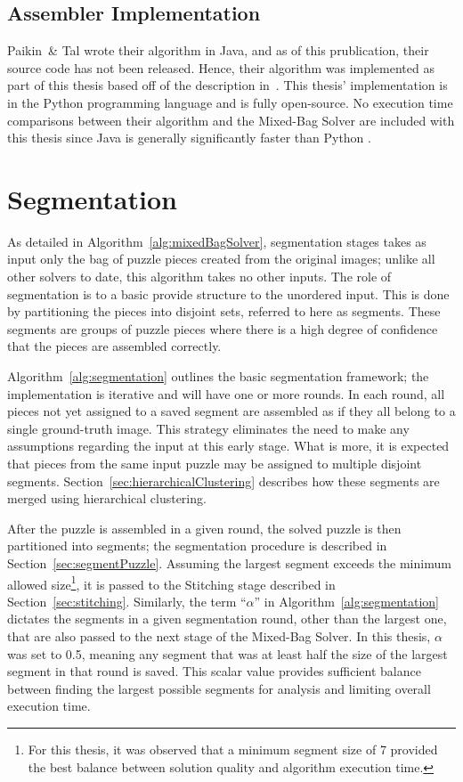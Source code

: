 \subsection{Assembler Implementation}\label{sec:assemblerImplementation}

Paikin~\& Tal wrote their algorithm in Java, and as of this prublication, their source code has not been released.  Hence, their algorithm was implemented as part of this thesis based off of the description in~\cite{paikin2015}.  This thesis' implementation is in the Python programming language and is fully open-source.  No execution time comparisons between their algorithm and the Mixed-Bag Solver are included with this thesis since Java is generally significantly faster than Python \cite{pythonJavaComparison}.

\section{Segmentation}\label{sec:Segmentation}

As detailed in Algorithm~\ref{alg:mixedBagSolver}, segmentation stages takes as input only the bag of puzzle pieces created from the original images; unlike all other solvers to date, this algorithm takes no other inputs.  The role of segmentation is to a basic provide structure to the unordered input.  This is done by partitioning the pieces into disjoint sets, referred to here as segments.  These segments are groups of puzzle pieces where there is a high degree of confidence that the pieces are assembled correctly.

Algorithm~\ref{alg:segmentation} outlines the basic segmentation framework; the implementation is iterative and will have one or more rounds.  In each round, all pieces not yet assigned to a saved segment are assembled as if they all belong to a single ground-truth image.  This strategy eliminates the need to make any assumptions regarding the input at this early stage.  What is more, it is expected that pieces from the same input puzzle may be assigned to multiple disjoint segments.  Section~\ref{sec:hierarchicalClustering} describes how these segments are merged using hierarchical clustering.

After the puzzle is assembled in a given round, the solved puzzle is then partitioned into segments; the segmentation procedure is described in Section~\ref{sec:segmentPuzzle}.  Assuming the largest segment exceeds the minimum allowed size\footnote{For this thesis, it was observed that a minimum segment size of 7 provided the best balance between solution quality and algorithm execution time.}, it is passed to the Stitching stage described in Section~\ref{sec:stitching}.  Similarly, the term ``\textit{$\alpha$}'' in Algorithm~\ref{alg:segmentation} dictates the segments in a given segmentation round, other than the largest one, that are also passed to the next stage of the Mixed-Bag Solver.  In this thesis, \textit{$\alpha$} was set to 0.5, meaning any segment that was at least half the size of the largest segment in that round is saved.  This scalar value provides sufficient balance between finding the largest possible segments for analysis and limiting overall execution time.

